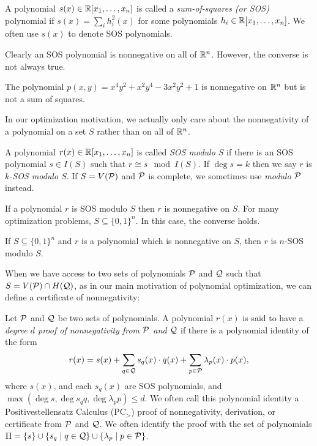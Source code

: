 \begin{definition}
A polynomial $s(x) \in \mathbb R[x_1,\dots,x_n]$ is called a \emph{sum-of-squares (or SOS)} polynomial if $s(x) = \sum_i h_i^2(x)$ for some polynomials $h_i \in \mathbb R[x_1,\dots,x_n]$. We often use $s(x)$ to denote SOS polynomials.
\end{definition}

Clearly an SOS polynomial is nonnegative on all of $\mathbb R^n$. However, the converse is not always true.
\begin{fact}
The polynomial $p(x,y) = x^4y^2 + x^2y^4 - 3x^2y^2 + 1$ is nonnegative on $\mathbb R^n$ but is not a sum of squares.
\end{fact}

In our optimization motivation, we actually only care about the nonnegativity of a polynomial on a set $S$ rather than on all of $\mathbb R^n$.

\begin{definition}
A polynomial $r(x) \in \mathbb R[x_1,\dots,x_n]$ is called \emph{SOS modulo $S$} if there is an SOS polynomial $s \in I(S)$ such that $r \cong s \mod I(S)$. If $\deg s = k$ then we say $r$ is \emph{$k$-SOS modulo $S$}. If $S = V(\mathcal P)$ and $\mathcal P$ is complete, we sometimes use \emph{modulo $\mathcal P$} instead.
\end{definition}
If a polynomial $r$ is SOS modulo $S$ then $r$ is nonnegative on $S$. For many optimization problems, $S \subseteq \{0,1\}^n$. In this case, the converse holds.
\begin{fact}\label{fact:boolSOS}
If $S \subseteq \{0,1\}^n$ and $r$ is a polynomial which is nonnegative on $S$, then $r$ is $n$-SOS modulo $S$.
\end{fact}

When we have access to two sets of polynomials $\mathcal P$ and $\mathcal Q$ such that $S = V(\mathcal P) \cap H(\mathcal Q)$, as in our main motivation  of polynomial optimization, we can define a certificate of nonnegativity:

\begin{definition}
Let $\mathcal P$ and $\mathcal Q$ be two sets of polynomials. A polynomial $r(x)$ is said to have a \emph{degree $d$ proof of nonnegativity from $\mathcal P$ and $\mathcal Q$} if there is a polynomial identity of the form
\[r(x) = s(x) + \sum_{q \in \mathcal Q} s_q(x) \cdot q(x) + \sum_{p \in \mathcal P} \lambda_p(x) \cdot p(x),\]
where $s(x)$, and each $s_q(x)$ are SOS polynomials, and $\max(\deg s, \deg s_qq, \deg \lambda_pp) \leq d$. We often call this polynomial identity a Positivestellensatz Calculus (PC$_>$) proof of nonnegativity, derivation, or certificate from $\mathcal P$ and $\mathcal Q$.
We often identify the proof with the set of polynomials $\Pi = \{s\} \cup \{s_q \mid q\in \mathcal Q\} \cup \{\lambda_p \mid p \in \mathcal P\}$.

\end{definition}

